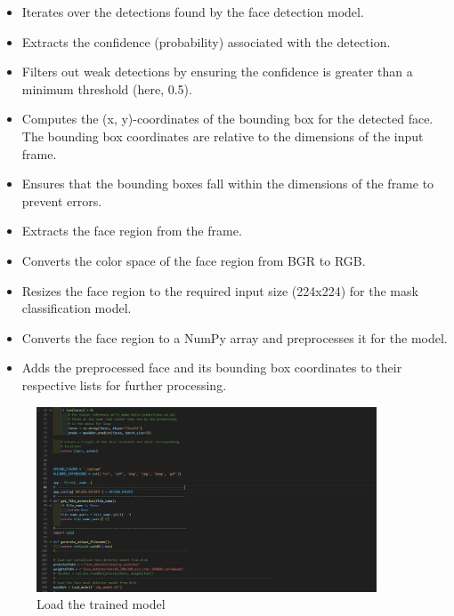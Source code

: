 \begin{itemize}
    \item Iterates over the detections found by the face detection model.
    \item Extracts the confidence (probability) associated with the detection.
    \item Filters out weak detections by ensuring the confidence is greater than a minimum threshold (here, 0.5).
    \item Computes the (x, y)-coordinates of the bounding box for the detected face. The bounding box coordinates are relative to the dimensions of the input frame.
    \item Ensures that the bounding boxes fall within the dimensions of the frame to prevent errors.
    \item Extracts the face region from the frame.
    \item Converts the color space of the face region from BGR to RGB.
    \item Resizes the face region to the required input size (224x224) for the mask classification model.
    \item Converts the face region to a NumPy array and preprocesses it for the model.
    \item Adds the preprocessed face and its bounding box coordinates to their respective lists for further processing.
\end{itemize}

\begin{figure}
    \centering
    \includegraphics[width=0.90\textwidth]{Img/Chap-01/45.jpg}
    \caption{Load the trained model}
    \label{fig:be_4}
\end{figure}

